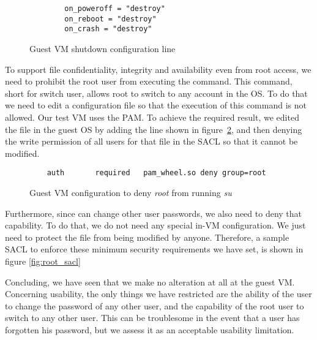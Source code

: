 \begin{figure}[ht]
	\centering
	\footnotesize{\selectfont 
	\begin{lstlisting}
		on_poweroff = "destroy"
		on_reboot = "destroy"
		on_crash = "destroy"
	\end{lstlisting}}
	\caption{Guest \ac{VM} shutdown configuration line}
	\label{fig:conf}
\end{figure}

\par To support file confidentiality, integrity and availability even from root access, we need to prohibit the root user from executing the  command. This command, short for switch user, allows root to switch to any account in the \ac{OS}. To do that we need to edit a configuration file so that the execution of this command is not allowed. Our test \ac{VM} uses the \ac{PAM}. To achieve the required result, we edited the  file in the guest \ac{OS} by adding the line shown in figure~\ref{fig:pam}, and then denying the write permission of all users for that file in the \ac{SACL} so that it cannot be modified.

\begin{figure}[ht]
	\centering
	\footnotesize{\selectfont 
	\begin{lstlisting}
	auth       required   pam_wheel.so deny group=root	
	\end{lstlisting}}
	\caption{Guest \ac{VM} configuration to deny \emph{root} from running \emph{su}}
	\label{fig:pam}
\end{figure}

\par Furthermore, since  can change other user passwords, we also need to deny that capability. To do that, we do not need any special in-\ac{VM} configuration. We just need to protect the  file from being modified by anyone. Therefore, a sample \ac{SACL} to enforce these minimum security requirements we have set, is shown in figure \ref{fig:root_sacl}


\par Concluding, we have seen that we make no alteration at all at the guest \ac{VM}. Concerning usability, the only things we have restricted are the ability of the  user to change the password of any other user, and the capability of the root user to switch to any other user. This can be troublesome in the event that a user has forgotten his password, but we assess it as an acceptable usability limitation.











